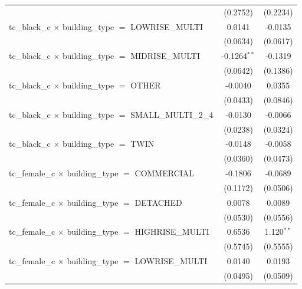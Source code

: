 \begin{tabular}{lcc}
                                                                       & (0.2752)       & (0.2234)\\   
   tc\_black\_c $\times$ building\_type $=$ LOWRISE\_MULTI             & 0.0141         & -0.0135\\   
                                                                       & (0.0634)       & (0.0617)\\   
   tc\_black\_c $\times$ building\_type $=$ MIDRISE\_MULTI             & -0.1264$^{**}$ & -0.1319\\   
                                                                       & (0.0642)       & (0.1386)\\   
   tc\_black\_c $\times$ building\_type $=$ OTHER                      & -0.0040        & 0.0355\\   
                                                                       & (0.0433)       & (0.0846)\\   
   tc\_black\_c $\times$ building\_type $=$ SMALL\_MULTI\_2\_4         & -0.0130        & -0.0066\\   
                                                                       & (0.0238)       & (0.0324)\\   
   tc\_black\_c $\times$ building\_type $=$ TWIN                       & -0.0148        & -0.0058\\   
                                                                       & (0.0360)       & (0.0473)\\   
   tc\_female\_c $\times$ building\_type $=$ COMMERCIAL                & -0.1806        & -0.0689\\   
                                                                       & (0.1172)       & (0.0506)\\   
   tc\_female\_c $\times$ building\_type $=$ DETACHED                  & 0.0078         & 0.0089\\   
                                                                       & (0.0530)       & (0.0556)\\   
   tc\_female\_c $\times$ building\_type $=$ HIGHRISE\_MULTI           & 0.6536         & 1.120$^{**}$\\   
                                                                       & (0.5745)       & (0.5555)\\   
   tc\_female\_c $\times$ building\_type $=$ LOWRISE\_MULTI            & 0.0140         & 0.0193\\   
                                                                       & (0.0495)       & (0.0509)\\   

\end{tabular}
